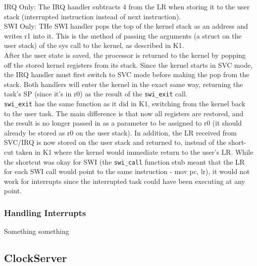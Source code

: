 \documentclass[12pt]{article}
\begin{document}
IRQ Only: The IRQ handler subtracts 4 from the LR when storing it to the user stack (interrupted instruction instead of next instruction).
\\
SWI Only: THe SWI handler pops the top of the kernel stack as an address and writes r1 into it. This is the method of passing the arguments (a struct on the user stack) of the sys call to the kernel, as described in K1.
\\
After the user state is saved, the processor is returned to the kernel by popping off the stored kernel registers from its stack. Since the kernel starts in SVC mode, the IRQ handler must first switch to SVC mode before making the pop from the stack. Both handlers will enter the kernel in the exact same way, returning the task's SP (since it's in r0) as the result of the \texttt{swi\_exit} call.
\\
\texttt{swi\_exit} has the same function as it did in K1, switching from the kernel back to the user task. The main difference is that now all registers are restored, and the result is no longer passed in as a parameter to be assigned to r0 (it should already be stored as r0 on the user stack). In addition, the LR received from SVC/IRQ is now stored on the user stack and returned to, instead of the short-cut taken in K1 where the kernel would immediate return to the user's LR. While the shortcut was okay for SWI (the \texttt{swi\_call} function stub meant that the LR for each SWI call would point to the same instruction - mov pc, lr), it would not work for interrupts since the interrupted task could have been executing at any point.

\subsubsection{Handling Interrupts}
Something something
\\[1\baselineskip]

\subsection{ClockServer}
\end{document}
